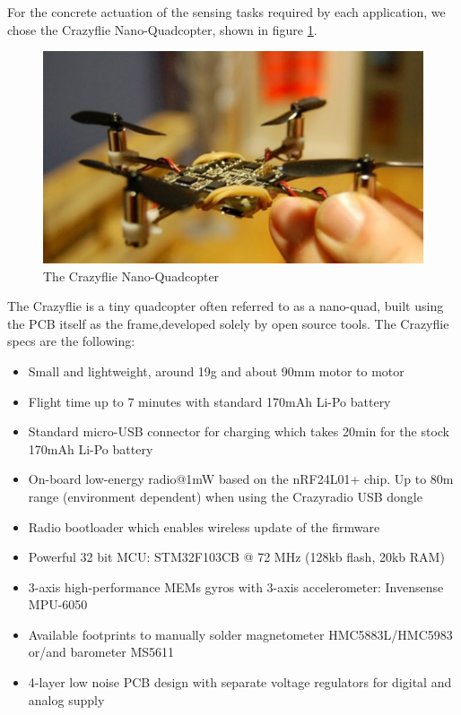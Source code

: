 For the concrete actuation of the sensing tasks required by each application, we chose the Crazyflie Nano-Quadcopter, shown in figure \ref{fig:crazyflie}.


\begin{figure}[H]
\centering
\includegraphics[width=\linewidth]
{pictures/crazyflie.jpg}
  \caption{The Crazyflie Nano-Quadcopter}
  \label{fig:crazyflie}
\end{figure}

The Crazyflie is a tiny quadcopter often referred to as a nano-quad, built using the PCB itself as the frame,developed solely by open source tools. The Crazyflie specs are the following:


\begin{itemize}
\item {Small and lightweight, around 19g and about 90mm motor to motor
}
\item {Flight time up to 7 minutes with standard 170mAh Li-Po battery
}
\item {Standard micro-USB connector for charging which takes 20min for the stock 170mAh Li-Po battery
}
\item {On-board low-energy radio@1mW based on the nRF24L01+ chip. Up to 80m range (environment dependent) when using the Crazyradio USB dongle}
\item{Radio bootloader which enables wireless update of the firmware
}
\item{Powerful 32 bit MCU: STM32F103CB @ 72 MHz (128kb flash, 20kb RAM)
}
\item{3-axis high-performance MEMs gyros with 3-axis accelerometer: Invensense MPU-6050
}
\item{Available footprints to manually solder magnetometer HMC5883L/HMC5983 or/and barometer MS5611
}
\item{4-layer low noise PCB design with separate voltage regulators for digital and analog supply
}
\end{itemize}

